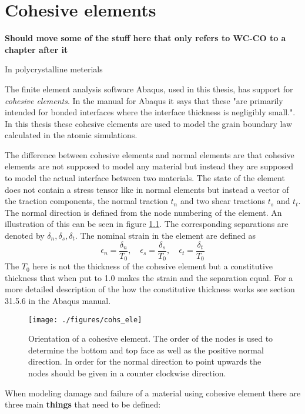 \documentclass[generate_interface_elements.tex]{subfiles}
\begin{document}
\chapter{Cohesive elements}

\textbf{Should move some of the stuff here that only refers to WC-CO to a chapter after it}

In polycrystalline meterials 

The finite element analysis software Abaqus, used in this thesis, has support for \textit{cohesive elements}. In the manual for Abaqus it says that these "are primarily intended for bonded interfaces where the interface thickness is negligibly small.". In this thesis these cohesive elements are used to model the grain boundary law calculated in the atomic simulations.

The difference between cohesive elements and normal elements are that cohesive elements are not supposed to model any material but instead they are supposed to model the actual interface between two materials. The state of the element does not contain a stress tensor like in normal elements but instead a vector of the traction components, the normal traction $t_n$ and two shear tractions $t_s$ and $t_t$. The normal direction is defined from the node numbering of the element. An illustration of this can be seen in figure \ref{fig:cohs_ori}. The corresponding separations are denoted by $\delta_n, \delta_s, \delta_t$. The nominal strain in the element are defined as
%
\[ \epsilon_n = \frac{\delta_n}{T_0}, \quad \epsilon_s = \frac{\delta_s}{T_0}, \quad \epsilon_t = \frac{\delta_t}{T_0}  \]
%
The $T_0$ here is not the thickness of the cohesive element but a constitutive thickness that when put to 1.0 makes the strain and the separation equal. For a more detailed description of the how the constitutive thickness works see section 31.5.6 in the Abaqus manual.



\begin{figure}
\centering
 \texttt{[image: ./figures/cohs\_ele]}
\caption{Orientation of a cohesive element. The order of the nodes is used to determine the bottom and top face as well as the positive normal direction. In order for the normal direction to point upwards the nodes should be given in a counter clockwise direction.}
\label{fig:cohs_ori}
\end{figure}


When modeling damage and failure of a material using cohesive element there are three main \textbf{things} that need to be defined:
\end{document}
